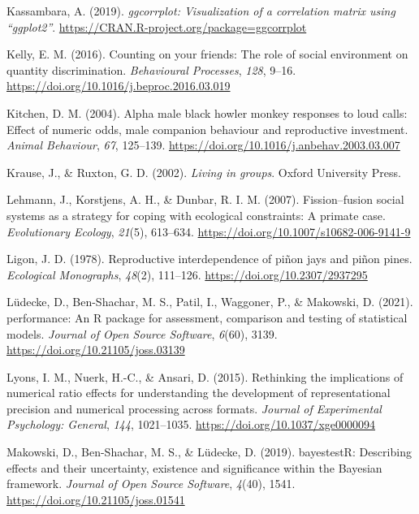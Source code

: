 \documentclass[
  ,pub,floatsintext]{apa6}
\newlength{\cslhangindent}
\newlength{\cslentryspacingunit} %
\newenvironment{CSLReferences}[2] %
 {%
  \setlength{\parindent}{0pt}
  \ifodd #1
  \let\oldpar\par
  \def\par{\hangindent=\cslhangindent\oldpar}
  \fi
  \setlength{\parskip}{#2\cslentryspacingunit}
 }%
 {}
\begin{document}
\begin{CSLReferences}{1}{0}
\leavevmode{}%
Kassambara, A. (2019). \emph{{ggcorrplot}: Visualization of a correlation matrix using {``ggplot2''}}. \url{https://CRAN.R-project.org/package=ggcorrplot}

\leavevmode{}%
Kelly, E. M. (2016). Counting on your friends: {The} role of social environment on quantity discrimination. \emph{Behavioural Processes}, \emph{128}, 9--16. \url{https://doi.org/10.1016/j.beproc.2016.03.019}

\leavevmode{}%
Kitchen, D. M. (2004). Alpha male black howler monkey responses to loud calls: Effect of numeric odds, male companion behaviour and reproductive investment. \emph{Animal Behaviour}, \emph{67}, 125--139. \url{https://doi.org/10.1016/j.anbehav.2003.03.007}

\leavevmode{}%
Krause, J., \& Ruxton, G. D. (2002). \emph{Living in groups}. {Oxford University Press}.

\leavevmode{}%
Lehmann, J., Korstjens, A. H., \& Dunbar, R. I. M. (2007). Fission--fusion social systems as a strategy for coping with ecological constraints: A primate case. \emph{Evolutionary Ecology}, \emph{21}(5), 613--634. \url{https://doi.org/10.1007/s10682-006-9141-9}

\leavevmode{}%
Ligon, J. D. (1978). Reproductive interdependence of piñon jays and piñon pines. \emph{Ecological Monographs}, \emph{48}(2), 111--126. \url{https://doi.org/10.2307/2937295}

\leavevmode{}%
Lüdecke, D., Ben-Shachar, M. S., Patil, I., Waggoner, P., \& Makowski, D. (2021). {performance}: An {R} package for assessment, comparison and testing of statistical models. \emph{Journal of Open Source Software}, \emph{6}(60), 3139. \url{https://doi.org/10.21105/joss.03139}

\leavevmode{}%
Lyons, I. M., Nuerk, H.-C., \& Ansari, D. (2015). Rethinking the implications of numerical ratio effects for understanding the development of representational precision and numerical processing across formats. \emph{Journal of Experimental Psychology: General}, \emph{144}, 1021--1035. \url{https://doi.org/10.1037/xge0000094}

\leavevmode{}%
Makowski, D., Ben-Shachar, M. S., \& Lüdecke, D. (2019). bayestestR: Describing effects and their uncertainty, existence and significance within the {Bayesian} framework. \emph{Journal of Open Source Software}, \emph{4}(40), 1541. \url{https://doi.org/10.21105/joss.01541}


\end{CSLReferences}
\end{document}
